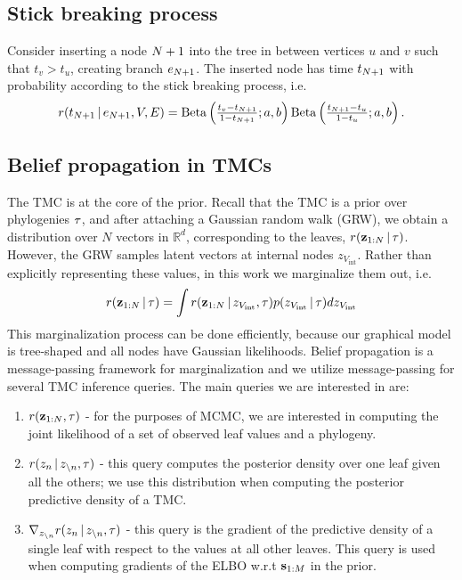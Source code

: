 \subsection{Stick breaking process}
\label{sec:stick-breaking}
Consider inserting a node $N + 1$ into the tree in between vertices $u$ and $v$
such that $t_v > t_u$,
creating branch $e_{N + 1}$.
The inserted node has time $t_{N + 1}$ with probability according to the stick breaking process, i.e.
\begin{equation}
\textstyle r(t_{N+1}\,|\, e_{N+1}, V, E) =
\mathrm{Beta}\left(\frac{t_v - t_{N + 1}}{1 - t_{N + 1}}; a, b\right)\mathrm{Beta}\left(\frac{t_{N + 1} - t_u}{1 - t_u}; a, b\right).
\end{equation}

\subsection{Belief propagation in TMCs}

The TMC is at the core of the \acronym\;
prior.
Recall that the TMC is
a prior over phylogenies $\tau$,
and after attaching a Gaussian random walk (GRW),
we obtain a distribution over $N$ vectors in $\mathbb{R}^d$,
corresponding to the leaves, $r(\mathbf{z}_{1:N} \,|\, \tau)$.
However, the GRW samples
latent vectors at internal nodes $z_{V_{\text{int}}}$.
Rather than explicitly representing these values,
in this work we marginalize them out, i.e.
\begin{equation}
    r(\mathbf{z}_{1:N} \,|\, \tau) = \int r(\mathbf{z}_{1:N} \,|\, z_{V_{\text{int}}}, \tau)p(z_{V_{\text{int}}} \,|\, \tau) dz_{V_{\text{int}}}
\end{equation}
This marginalization process can be done efficiently, because our graphical model
is tree-shaped and all nodes have Gaussian likelihoods. Belief propagation is a message-passing
framework for marginalization and we utilize message-passing
for several TMC inference queries. The main queries we are interested in are:
\begin{enumerate}
    \item $r(\mathbf{z}_{1:N}, \tau)$ - for the purposes of MCMC, we are interested in computing the joint likelihood of a set of observed
    leaf values and a phylogeny.
    \item $r(z_n \,|\, z_{\backslash n}, \tau)$ - this query computes the posterior density over one leaf given all the others;
    we use this distribution when computing the posterior predictive density of a TMC.
    \item $\nabla_{z_{\backslash n}} r(z_n \,|\, z_{\backslash n}, \tau)$ - this query is the gradient of the predictive density 
    of a single leaf with respect to the values at all other leaves. This query is used
    when computing gradients of the ELBO w.r.t $\mathbf{s}_{1:M}$ in the \acronym\;prior.
\end{enumerate}

